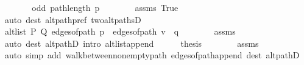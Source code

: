 \begin{isabellebody}
\ \ \ \ \isamarkupfalse%
\ \isamarkupfalse%
\ {\isachardoublequoteopen}odd\ {\isacharparenleft}{\kern0pt}path{\isacharunderscore}{\kern0pt}length\ p{\isacharprime}{\kern0pt}{\isacharparenright}{\kern0pt}{\isachardoublequoteclose}\isanewline
\ \ \ \ \ \ \isamarkupfalse%
\ assms\ True\isanewline
\ \ \ \ \ \ \isamarkupfalse%
\ {\isacharparenleft}{\kern0pt}auto\ dest{\isacharcolon}{\kern0pt}\ alt{\isacharunderscore}{\kern0pt}path{\isacharunderscore}{\kern0pt}pref\ two{\isacharunderscore}{\kern0pt}alt{\isacharunderscore}{\kern0pt}pathsD{\isacharparenright}{\kern0pt}\isanewline
\ \ \ \ \isamarkupfalse%
\ \isamarkupfalse%
\ {\isachardoublequoteopen}alt{\isacharunderscore}{\kern0pt}list\ P\ Q\ {\isacharparenleft}{\kern0pt}edges{\isacharunderscore}{\kern0pt}of{\isacharunderscore}{\kern0pt}path\ p{\isacharprime}{\kern0pt}\ {\isacharat}{\kern0pt}\ edges{\isacharunderscore}{\kern0pt}of{\isacharunderscore}{\kern0pt}path\ {\isacharparenleft}{\kern0pt}v\ {\isacharhash}{\kern0pt}\ q{\isacharparenright}{\kern0pt}{\isacharparenright}{\kern0pt}{\isachardoublequoteclose}\isanewline
\ \ \ \ \ \ \isamarkupfalse%
\ assms{\isacharparenleft}{\kern0pt}{}{\isacharparenright}{\kern0pt}\isanewline
\ \ \ \ \ \ \isamarkupfalse%
\ {\isacharparenleft}{\kern0pt}auto\ dest{\isacharcolon}{\kern0pt}\ alt{\isacharunderscore}{\kern0pt}pathD{\isacharparenleft}{\kern0pt}{}{\isacharparenright}{\kern0pt}\ intro{\isacharcolon}{\kern0pt}\ alt{\isacharunderscore}{\kern0pt}list{\isacharunderscore}{\kern0pt}append{\isacharunderscore}{\kern0pt}{}{\isacharparenright}{\kern0pt}\isanewline
\ \ \ \ \isamarkupfalse%
\ {\isacharquery}{\kern0pt}thesis\isanewline
\ \ \ \ \ \ \isamarkupfalse%
\ assms{\isacharparenleft}{\kern0pt}{}{\isacharparenright}{\kern0pt}\isanewline
\ \ \ \ \ \ \isamarkupfalse%
\ {\isacharparenleft}{\kern0pt}auto\ simp\ add{\isacharcolon}{\kern0pt}\ walk{\isacharunderscore}{\kern0pt}between{\isacharunderscore}{\kern0pt}nonempty{\isacharunderscore}{\kern0pt}path{\isacharparenleft}{\kern0pt}{}{\isacharparenright}{\kern0pt}\ edges{\isacharunderscore}{\kern0pt}of{\isacharunderscore}{\kern0pt}path{\isacharunderscore}{\kern0pt}append{\isacharunderscore}{\kern0pt}{}\ dest{\isacharcolon}{\kern0pt}\ alt{\isacharunderscore}{\kern0pt}pathD{\isacharparenleft}{\kern0pt}{}{\isacharparenright}{\kern0pt}{\isacharparenright}{\kern0pt}\isanewline

\end{isabellebody}

